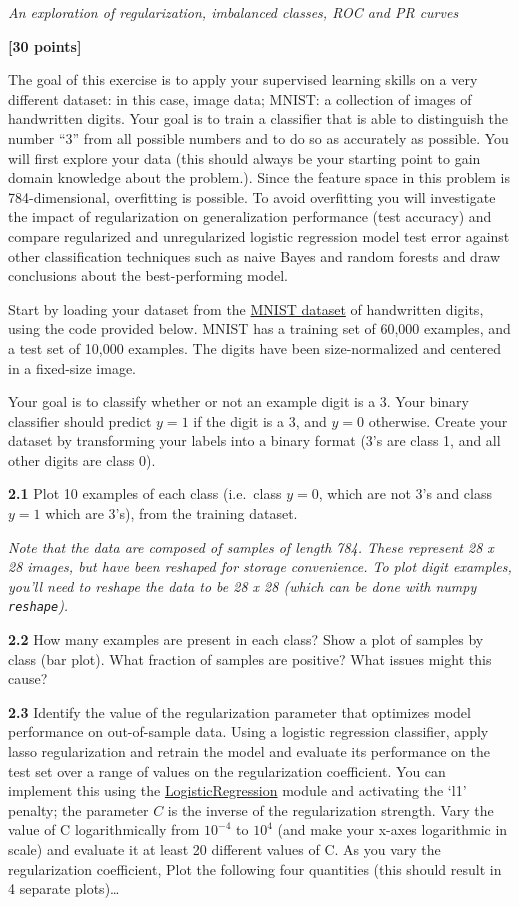 \documentclass[
  letterpaper,
  DIV=11,
  numbers=noendperiod]{scrartcl}
\begin{document}
\emph{An exploration of regularization, imbalanced classes, ROC and PR
curves}

\textbf{{[}30 points{]}}

The goal of this exercise is to apply your supervised learning skills on
a very different dataset: in this case, image data; MNIST: a collection
of images of handwritten digits. Your goal is to train a classifier that
is able to distinguish the number ``3'' from all possible numbers and to
do so as accurately as possible. You will first explore your data (this
should always be your starting point to gain domain knowledge about the
problem.). Since the feature space in this problem is 784-dimensional,
overfitting is possible. To avoid overfitting you will investigate the
impact of regularization on generalization performance (test accuracy)
and compare regularized and unregularized logistic regression model test
error against other classification techniques such as naive Bayes and
random forests and draw conclusions about the best-performing model.

Start by loading your dataset from the
\href{http://yann.lecun.com/exdb/mnist/}{MNIST dataset} of handwritten
digits, using the code provided below. MNIST has a training set of
60,000 examples, and a test set of 10,000 examples. The digits have been
size-normalized and centered in a fixed-size image.

Your goal is to classify whether or not an example digit is a 3. Your
binary classifier should predict \(y=1\) if the digit is a 3, and
\(y=0\) otherwise. Create your dataset by transforming your labels into
a binary format (3's are class 1, and all other digits are class 0).

\textbf{2.1} Plot 10 examples of each class (i.e.~class \(y=0\), which
are not 3's and class \(y=1\) which are 3's), from the training dataset.

\emph{Note that the data are composed of samples of length 784. These
represent 28 x 28 images, but have been reshaped for storage
convenience. To plot digit examples, you'll need to reshape the data to
be 28 x 28 (which can be done with numpy \texttt{reshape}).}

\textbf{2.2} How many examples are present in each class? Show a plot of
samples by class (bar plot). What fraction of samples are positive? What
issues might this cause?

\textbf{2.3} Identify the value of the regularization parameter that
optimizes model performance on out-of-sample data. Using a logistic
regression classifier, apply lasso regularization and retrain the model
and evaluate its performance on the test set over a range of values on
the regularization coefficient. You can implement this using the
\href{http://scikit-learn.org/stable/modules/generated/sklearn.linear_model.LogisticRegression.html}{LogisticRegression}
module and activating the `l1' penalty; the parameter \(C\) is the
inverse of the regularization strength. Vary the value of C
logarithmically from \(10^{-4}\) to \(10^4\) (and make your x-axes
logarithmic in scale) and evaluate it at least 20 different values of C.
As you vary the regularization coefficient, Plot the following four
quantities (this should result in 4 separate plots)\ldots{}
\end{document}
